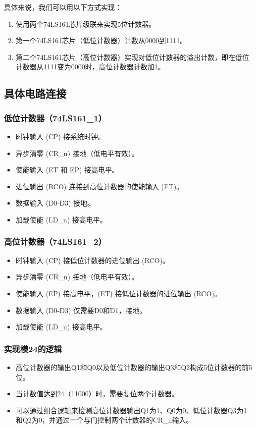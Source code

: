 \documentclass[a4,10pt,zihao=-4]{ctexart}
\begin{document}
具体来说，我们可以用以下方式实现：
\begin{enumerate}
  \item 使用两个74LS161芯片级联来实现5位计数器。
  \item 第一个74LS161芯片（低位计数器）计数从0000到1111。
  \item 第二个74LS161芯片（高位计数器）实现对低位计数器的溢出计数，即在低位计数器从1111变为0000时，高位计数器计数加1。
\end{enumerate}

\subsection{具体电路连接}

\subsubsection{低位计数器（74LS161\_1）}
\begin{itemize}
  \item 时钟输入 (CP) 接系统时钟。
  \item 异步清零 (CR\_n) 接地（低电平有效）。
  \item 使能输入 (ET 和 EP) 接高电平。
  \item 进位输出 (RCO) 连接到高位计数器的使能输入 (ET)。
  \item 数据输入 (D0-D3) 接地。
  \item 加载使能 (LD\_n) 接高电平。
\end{itemize}

\subsubsection{高位计数器（74LS161\_2）}
\begin{itemize}
  \item 时钟输入 (CP) 接低位计数器的进位输出 (RCO)。
  \item 异步清零 (CR\_n) 接地（低电平有效）。
  \item 使能输入 (EP) 接高电平，(ET) 接低位计数器的进位输出 (RCO)。
  \item 数据输入 (D0-D3) 仅需要D0和D1，接地。
  \item 加载使能 (LD\_n) 接高电平。
\end{itemize}

\subsubsection{实现模24的逻辑}
\begin{itemize}
  \item 高位计数器的输出Q1和Q0以及低位计数器的输出Q3和Q2构成5位计数器的前5位。
  \item 当计数值达到24（11000）时，需要复位两个计数器。
  \item 可以通过组合逻辑来检测高位计数器输出Q1为1、Q0为0、低位计数器Q3为1和Q2为0，并通过一个与门控制两个计数器的CR\_n输入。
\end{itemize}
\end{document}
